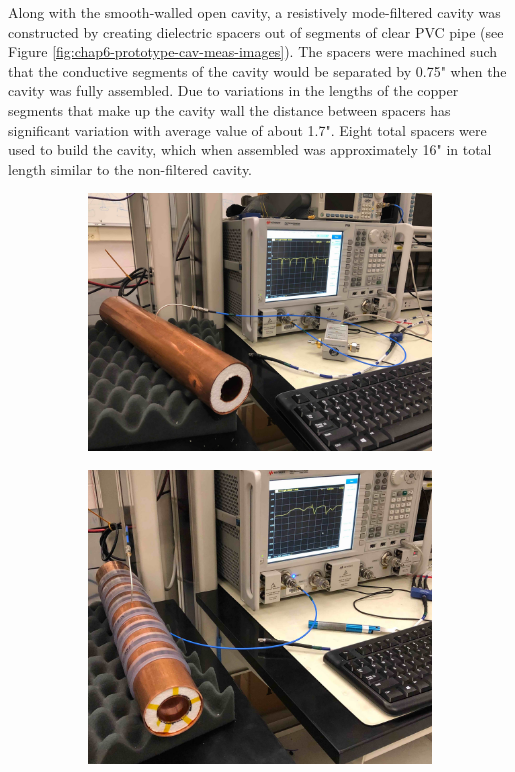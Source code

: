 Along with the smooth-walled open cavity, a resistively mode-filtered cavity was constructed by creating dielectric spacers out of segments of clear PVC pipe (see Figure \ref{fig:chap6-prototype-cav-meas-images}). The spacers were machined such that the conductive segments of the cavity would be separated by 0.75" when the cavity was fully assembled. Due to variations in the lengths of the copper segments that make up the cavity wall the distance between spacers has significant variation with average value of about 1.7". Eight total spacers were used to build the cavity, which when assembled was approximately 16" in total length similar to the non-filtered cavity.
\begin{figure}[htbp]
    \centering
    \begin{subfigure}{0.48\textwidth}
        \includegraphics*[width=\textwidth]{figs/Chapter-6/230612_open_cav_meas_image.jpg}
        \caption{}        
    \end{subfigure}
    \hfill
    \begin{subfigure}{0.48\textwidth}
        \includegraphics*[width=\textwidth]{figs/Chapter-6/230612_filtered_cav_meas_image.jpg}

\end{subfigure}
\end{figure}
